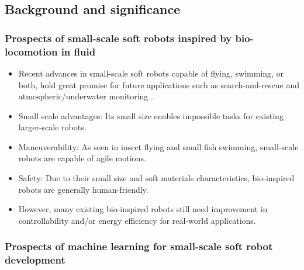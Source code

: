 \documentclass[12pt, a4paper]{article}
\begin{document}
\hypertarget{background-and-significance-1}{%
\subsection{Background and
significance}\label{background-and-significance-1}}

\hypertarget{prospects-of-small-scale-soft-robots-inspired-by-bio-locomotion-in-fluid-1}{%
\subsubsection{Prospects of small-scale soft robots inspired by
bio-locomotion in
fluid}\label{prospects-of-small-scale-soft-robots-inspired-by-bio-locomotion-in-fluid-1}}

\begin{itemize}
\item
  Recent advances in small-scale soft robots capable of flying,
  swimming, or both, hold great promise for future applications such as
  search-and-rescue and atmospheric/underwater monitoring
  \citep[\citet{Aubin2019},\citet{Chen2017}]{Jafferis2019}.
\item
  Small scale advantages: Its small size enables impossible tasks for
  existing larger-scale robots.
\item
  Maneuverability: As seen in insect flying and small fish swimming,
  small-scale robots are capable of agile motions.
\item
  Safety: Due to their small size and soft materials characteristics,
  bio-inspired robots are generally human-friendly.
\item
  However, many existing bio-inspired robots still need improvement in
  controllability and/or energy efficiency for real-world applications.
\end{itemize}

\hypertarget{prospects-of-machine-learning-for-small-scale-soft-robot-development-1}{%
\subsubsection{Prospects of machine learning for small-scale soft robot
development}\label{prospects-of-machine-learning-for-small-scale-soft-robot-development-1}}
\end{document}
